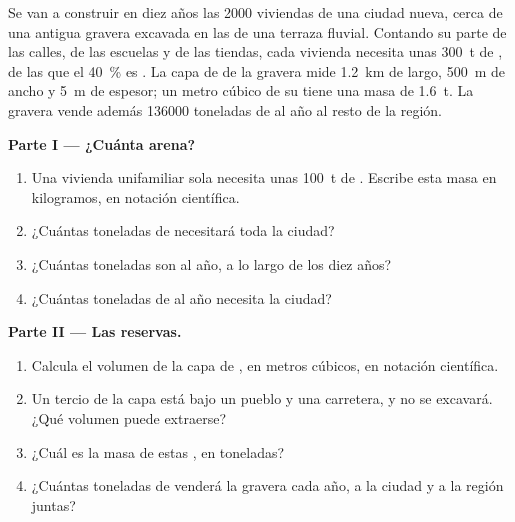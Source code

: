 \begin{problem}
\label{pb:g9:earth-resources:1}
Se van a construir en diez años las \num{2000} viviendas de una ciudad
nueva, cerca de una antigua gravera excavada en las  de una terraza
fluvial. Contando su parte de las calles, de las escuelas y de las
tiendas, cada vivienda necesita unas \qty{300}{t} de , de las que el
\qty{40}{\%} es . La capa de  de la gravera mide \qty{1.2}{km} de
largo, \qty{500}{m} de ancho y \qty{5}{m} de espesor; un metro cúbico de su
 tiene una masa de \qty{1.6}{t}. La gravera vende además
\num{136000} toneladas de  al año al resto de la región.

\noindent\textbf{Parte I --- ¿Cuánta arena?}\par\nopagebreak
\begin{enumerate}[beginpenalty=10000]
  \item Una vivienda unifamiliar sola necesita unas \qty{100}{t} de
        . Escribe esta masa en kilogramos, en notación científica.
  \item ¿Cuántas toneladas de  necesitará toda la ciudad?
  \item ¿Cuántas toneladas son al año, a lo largo de los diez años?
  \item ¿Cuántas toneladas de  al año necesita la ciudad?
\end{enumerate}

\noindent\textbf{Parte II --- Las reservas.}\par\nopagebreak
\begin{enumerate}[resume, beginpenalty=10000]
  \item Calcula el volumen de la capa de , en metros cúbicos, en
        notación científica.
  \item Un tercio de la capa está bajo un pueblo y una carretera, y no se
        excavará. ¿Qué volumen puede extraerse?
  \item ¿Cuál es la masa de estas , en toneladas?
  \item ¿Cuántas toneladas de  venderá la gravera cada año, a la
        ciudad y a la región juntas?
\end{enumerate}


\end{problem}
